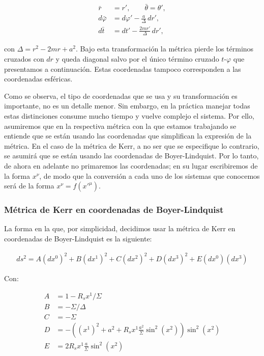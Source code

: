 \begin{align}
    \bar{r} &= r', \qquad \bar{\theta} = \theta', \\
    d\bar{\varphi} &= d\varphi' - \frac{a}{\Delta}\, dr', \\
    d\bar{t} &= dt' - \frac{2mr'}{\Delta}\, dr',
\end{align}

con $\Delta = r^2 - 2mr + a^2$. Bajo esta transformación la métrica pierde los términos cruzados con $dr$ y queda diagonal salvo por el único término cruzado $t$-$\varphi$ que presentamos a continuación. Estas coordenadas tampoco corresponden a las coordenadas esféricas.

Como se observa, el tipo de coordenadas que se usa y su transformación es importante, no es un detalle menor. Sin embargo, en la práctica manejar todas estas distinciones consume mucho tiempo y vuelve complejo el sistema. Por ello, asumiremos que en la respectiva métrica con la que estamos trabajando se entiende que se están usando las coordenadas que simplifican la expresión de la métrica. En el caso de la métrica de Kerr, a no ser que se especifique lo contrario, se asumirá que se están usando las coordenadas de Boyer-Lindquist. Por lo tanto, de ahora en adelante no primaremos las coordenadas; en su lugar escribiremos de la forma $x^\nu$, de modo que la conversión a cada uno de los sistemas que conocemos será de la forma $x^\nu = f(x'^\mu)$.

\subsubsection{Métrica de Kerr en coordenadas de Boyer-Lindquist}
La forma en la que, por simplicidad, decidimos usar la métrica de Kerr en coordenadas de Boyer-Lindquist es la siguiente:

\begin{align}
    ds^2 = A (dx^0)^2 + B (dx^1)^2 + C (dx^2)^2 + D (dx^3)^2 + E (dx^0)(dx^3)
\end{align}

Con:

\begin{align}
    A &= 1 - R_s  x^1 / \Sigma\\
    B &= -\Sigma / \Delta \\
    C &= -\Sigma \\
    D &= -\left((x^1)^2 + a^2 + R_s  x^1  \frac{a^2}{ \Sigma}  \sin^2(x^2)\right)  \sin^2(x^2) \\
    E &= 2  R_s  x^1  \frac{a}{ \Sigma}  \sin^2(x^2)
\end{align}

